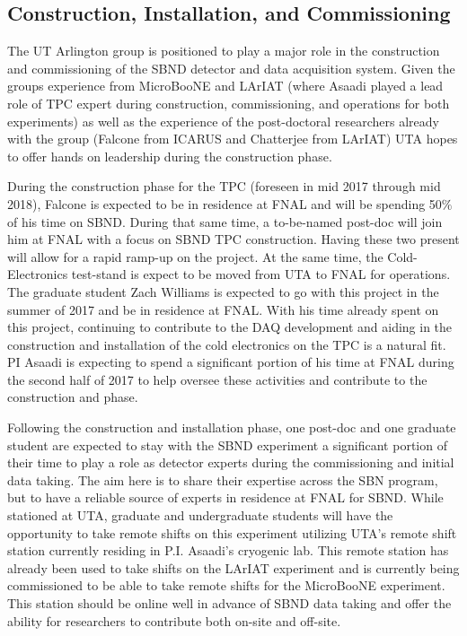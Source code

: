 \subsection{Construction, Installation, and Commissioning}\label{sec:SBNDBulid}
The UT Arlington group is positioned to play a major role in the construction and commissioning of the SBND detector and data acquisition system. Given the groups experience from MicroBooNE and LArIAT (where Asaadi played a lead role of TPC expert during construction, commissioning, and operations for both experiments) as well as the experience of the post-doctoral researchers already with the group (Falcone from ICARUS and Chatterjee from LArIAT) UTA hopes to offer hands on leadership during the construction phase.

During the construction phase for the TPC (foreseen in mid 2017 through mid 2018), Falcone is expected to be in residence at FNAL and will be spending 50$\%$ of his time on SBND. During that same time, a to-be-named post-doc will join him at FNAL with a focus on SBND TPC construction. Having these two present will allow for a rapid ramp-up on the project. At the same time, the Cold-Electronics test-stand is expect to be moved from UTA to FNAL for operations. The graduate student Zach Williams is expected to go with this project in the summer of 2017 and be in residence at FNAL. With his time already spent on this project, continuing to contribute to the DAQ development and aiding in the construction and installation of the cold electronics on the TPC is a natural fit. PI Asaadi is expecting to spend a significant portion of his time at FNAL during the second half of 2017 to help oversee these activities and contribute to the construction and phase.

Following the construction and installation phase, one post-doc and one graduate student are expected to stay with the SBND experiment a significant portion of their time to play a role as detector experts during the commissioning and initial data taking. The aim here is to share their expertise across the SBN program, but to have a reliable source of experts in residence at FNAL for SBND.  While stationed at UTA, graduate and undergraduate students will have the opportunity to take remote shifts on this experiment utilizing UTA's remote shift station currently residing in P.I. Asaadi's cryogenic lab. This remote station has already been used to take shifts on the LArIAT experiment and is currently being commissioned to be able to take remote shifts for the MicroBooNE experiment. This station should be online well in advance of SBND data taking and offer the ability for researchers to contribute both on-site and off-site.





